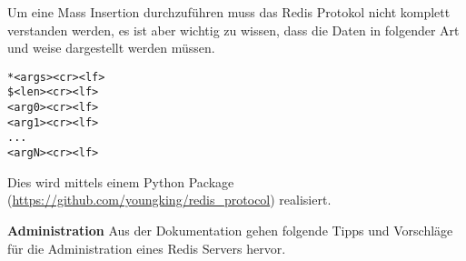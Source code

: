 Um eine Mass Insertion durchzuführen muss das Redis Protokol nicht komplett verstanden werden, es ist aber wichtig zu wissen, dass die Daten in folgender Art und weise dargestellt werden müssen.

\begin{lstlisting}[caption=RESP]
*<args><cr><lf>
$<len><cr><lf>
<arg0><cr><lf>
<arg1><cr><lf>
...
<argN><cr><lf>
\end{lstlisting}

Dies wird mittels einem Python Package (\url{https://github.com/youngking/redis_protocol}) realisiert.

\textbf{Administration\newline}
Aus der Dokumentation\cite{MELD.CH3-redis.mainWebsite} gehen folgende Tipps und Vorschläge für die Administration eines Redis Servers hervor.


